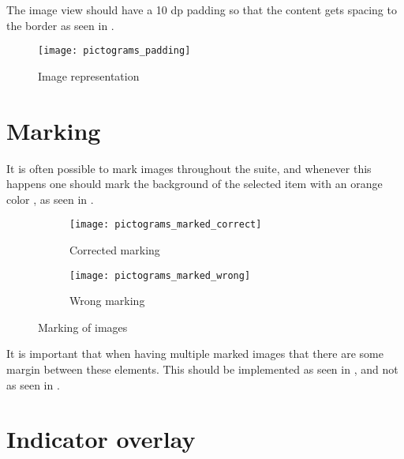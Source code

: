 \noindent
The image view should have a 10 dp padding so that the content gets spacing to the border as seen in .

\begin{figure}[h]
	\centering
	\texttt{[image: pictograms\_padding]}
	\caption{Image representation}
	\label{fig:pictograms_padding}
\end{figure} 
\FloatBarrier

\section{Marking}
\label{sec:marking}
It is often possible to mark images throughout the suite, and whenever this happens one should mark the background of the selected item with an orange color , as seen in . 

\begin{figure}[!htbp]
    \centering

    \begin{subfigure}[t]{0.4\textwidth}
    	\centering
        \texttt{[image: pictograms\_marked\_correct]}
        \caption{Corrected marking}
        \label{fig:pictograms_marked_corect}
    \end{subfigure}
    \hspace{5em} 
    \begin{subfigure}[t]{0.4\textwidth}
    	\centering
        \texttt{[image: pictograms\_marked\_wrong]}
        \caption{Wrong marking}
        \label{fig:pictograms_marked_wrong}
    \end{subfigure}
    
    \caption{Marking of images}
    \label{fig:pictograms_marked}
\end{figure}

\begin{note}
	It is important that when having multiple marked images that there are some margin between these elements. This should be implemented as seen in , and not as seen in .
\end{note} 

\section{Indicator overlay}
\label{sec:indicator_overlay}

